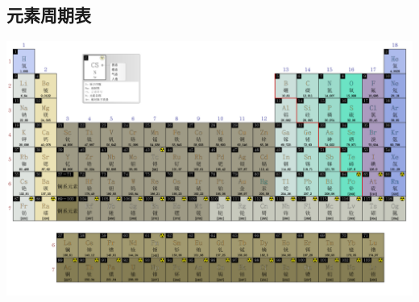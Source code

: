 \begin{landscape}
    \centering
    \chapter{元素周期表}\label{app:3}
    \includegraphics[width=24cm]{../pic-pdf/czhx1-periodictable.png}
\end{landscape}

